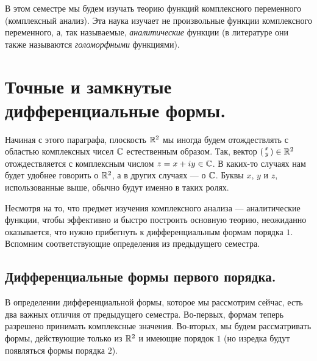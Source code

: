 \documentclass[../complex-analysis.tex]{subfiles}
\begin{document}
В этом семестре мы будем изучать теорию функций комплексного переменного (комплексный анализ). Эта наука изучает не произвольные функции комплексного переменного, а, так называемые, \textit{аналитические} функции (в литературе они также называются \textit{голоморфными} функциями). 

\section{Точные и замкнутые дифференциальные формы.}

\begin{conventn*}
 Начиная с этого параграфа, плоскость $\mathbb{R}^{2}$ мы иногда будем отождествлять с областью комплексных чисел $\mathbb{C}$ естественным образом. Так, вектор $ \begin{psmallmatrix}
  x \\ y
 \end{psmallmatrix} \in \mathbb{R}^{2}$ отождествляется с комплексным числом $z = x+iy \in \mathbb{C}$. В каких-то случаях нам будет удобнее говорить о $\mathbb{R}^{2}$, а в других случаях --- о $\mathbb{C}$. Буквы $ x $, $ y $ и $ z $, использованные выше, обычно будут именно в таких ролях.
\end{conventn*}


Несмотря на то, что предмет изучения комплексного анализа --- аналитические функции, чтобы эффективно и быстро построить основную теорию, неожиданно оказывается, что нужно прибегнуть к дифференциальным формам порядка $1$. Вспомним соответствующие определения из предыдущего семестра.

\subsection{Дифференциальные формы первого порядка.}

В определении дифференциальной формы, которое мы рассмотрим сейчас,  есть два важных отличия от предыдущего семестра. Во-первых, формам теперь разрешено принимать комплексные значения. Во-вторых, мы будем рассматривать формы, действующие только из $\mathbb{R}^{2}$ и имеющие порядок $1$ (но изредка будут появляться формы порядка $ 2 $).
\end{document}
